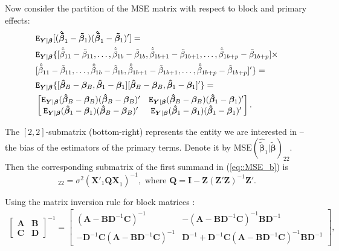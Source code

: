 Now consider the partition of the MSE matrix with respect to block and primary effects:
\begin{align}
\label{eq::mse_b_matrix}
&\mathtt{E}_{\bm{Y}|\bm{\beta}}[(\bm{\hat{\tilde{\beta}}}_1-\bm{\tilde{\beta}}_1)(\bm{\hat{\tilde{\beta}}}_1-\bm{\tilde{\beta}}_1)']= \notag\\ &\mathtt{E}_{\bm{Y}|\bm{\beta}}\{[\hat{\tilde{\beta}}_{11}-\tilde{\beta}_{11},\ldots,
\hat{\tilde{\beta}}_{1b}-\tilde{\beta}_{1b}, \hat{\tilde{\beta}}_{1 b+1}-\tilde{\beta}_{1 b+1},\ldots, \hat{\tilde{\beta}}_{1 b+p}-\tilde{\beta}_{1 b+p}]\times \notag\\ &[\hat{\tilde{\beta}}_{11}-\tilde{\beta}_{11},\ldots,
\hat{\tilde{\beta}}_{1b}-\tilde{\beta}_{1b}, \hat{\tilde{\beta}}_{1 b+1}-\tilde{\beta}_{1 b+1},\ldots, \hat{\tilde{\beta}}_{1 b+p}-\tilde{\beta}_{1 b+p}]'\}=\notag\\
&\mathtt{E}_{\bm{Y}|\bm{\beta}}\{[\bm{\hat{\beta}}_B-\bm{\beta}_B, \bm{\hat{\beta}}_1-\bm{\beta}_1][\bm{\hat{\beta}}_B-\bm{\beta}_B, \bm{\hat{\beta}}_1-\bm{\beta}_1]'\}=\notag\\
&\begin{bmatrix}
\mathtt{E}_{\bm{Y}|\bm{\beta}}(\bm{\hat{\beta}}_B-\bm{\beta}_B)(\bm{\hat{\beta}}_B-\bm{\beta}_B)' & \mathtt{E}_{\bm{Y}|\bm{\beta}}(\bm{\hat{\beta}}_B-\bm{\beta}_B)(\bm{\hat{\beta}}_1-\bm{\beta}_1)'\\
\mathtt{E}_{\bm{Y}|\bm{\beta}}(\bm{\hat{\beta}}_1-\bm{\beta}_1)(\bm{\hat{\beta}}_B-\bm{\beta}_B)' & \mathtt{E}_{\bm{Y}|\bm{\beta}}(\bm{\hat{\beta}}_1-\bm{\beta}_1)(\bm{\hat{\beta}}_1-\bm{\beta}_1)'
\end{bmatrix}.
\end{align}

The $[2,2]$-submatrix (bottom-right) represents the entity we are interested in -- the bias of the estimators of the primary terms. Denote it by $\mbox{MSE}(\bm{\hat{\tilde{\beta}}}_1|\bm{\tilde{\beta}})_{22}$. Then the corresponding submatrix of the first summand in (\ref{eq::MSE_b}) is
\begin{equation*}
[\sigma^2(\bm{\tilde{X}}_1^{'}\bm{\tilde{X}}_1)^{-1}]_{22}=\sigma^2(\bm{X}'_{1}
\bm{QX}_{1})^{-1}, \mbox { where } \bm{Q}=\bm{I}-\bm{Z}(\bm{Z}'\bm{Z})^{-1}\bm{Z}'. 
\end{equation*}

Using the matrix inversion rule for block matrices \citep{Harville2006matrix}:
\begin{align*}
\begin{bmatrix}
\bm{A} & \bm{B}\\
\bm{C} & \bm{D}
\end{bmatrix}
^{-1}=
\begin{bmatrix}
(\bm{A}-\bm{BD}^{-1}\bm{C})^{-1} & -(\bm{A}-\bm{BD}^{-1}\bm{C})^{-1}\bm{BD}^{-1} \\
-\bm{D}^{-1}\bm{C}(\bm{A}-\bm{BD}^{-1}\bm{C})^{-1} & \bm{D}^{-1}+\bm{D}^{-1}\bm{C}(\bm{A}-\bm{BD}^{-1}\bm{C})^{-1}\bm{BD}^{-1}
\end{bmatrix},
\end{align*}

